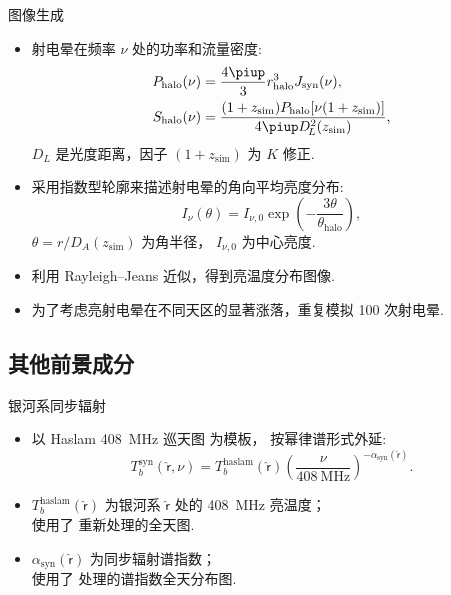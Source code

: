 \documentclass{beamer}
\newcommand{\R}[1]{\text{#1}}  %
\newcommand{\Cpi}{\piup}  %
\newcommand{\B}[1]{\bm{\mathsf{#1}}}  %
\newcommand{\citeay}[1]{\citeauthor{#1} \citeyear{#1} \parencite{#1}}
\begin{document}
\begin{frame}{图像生成}
  \begin{itemize}
    \item 射电晕在频率 $\nu$ 处的功率和流量密度:
      \begin{align}
        P_{\R{halo}}(\nu)
          & = \frac{4\Cpi}{3} r^3_{\R{halo}} J_{\R{syn}}(\nu) , \\
        S_{\R{halo}}(\nu)
          & = \frac{(1+z_{\R{sim}}) P_{\R{halo}}[\nu (1+z_{\R{sim}})]}{
            4\Cpi D^2_{\!L}(z_{\R{sim}})} ,
      \end{align}
      $D_{\!L}$ 是光度距离，因子 $(1+z_{\R{sim}})$ 为 $K$ 修正.
    \item 采用指数型轮廓来描述射电晕的角向平均亮度分布:
      \begin{equation}
        I_{\nu}(\theta) = I_{\nu,0} \exp
          \left( -\frac{3\theta}{\theta_{\R{halo}}} \right) ,
      \end{equation}
      $\theta = r / D_{\!A}(z_{\R{sim}})$ 为角半径，
      $I_{\nu,0}$ 为中心亮度.
    \item 利用 Rayleigh--Jeans 近似，得到亮温度分布图像.
    \item 为了考虑亮射电晕在不同天区的显著涨落，重复模拟 100 次射电晕.
  \end{itemize}
\end{frame}

\subsection{其他前景成分}

\begin{frame}{银河系同步辐射}
  \begin{itemize}
    \item 以 Haslam \SI{408}{\MHz} 巡天图\cite{haslam1982} 为模板，
      按幂律谱形式外延:
      \begin{equation}
        T_b^{\R{syn}}(\hat{\B{r}}, \nu)
          = T_b^{\R{haslam}}(\hat{\B{r}})
            \left( \frac{\nu}{\SI{408}{\MHz}}
            \right)^{-\alpha_{\R{syn}}(\hat{\B{r}})} .
      \end{equation}
    \item $T_b^{\R{haslam}}(\hat{\B{r}})$
      为银河系 $\hat{\B{r}}$ 处的 \SI{408}{\MHz} 亮温度；\\
      使用了 \citeay{remazeilles2015} 重新处理的全天图.
    \item $\alpha_{\R{syn}}(\hat{\B{r}})$ 为同步辐射谱指数；\\
      使用了 \citeay{giardino2002} 处理的谱指数全天分布图.
  \end{itemize}
\end{frame}
\end{document}
